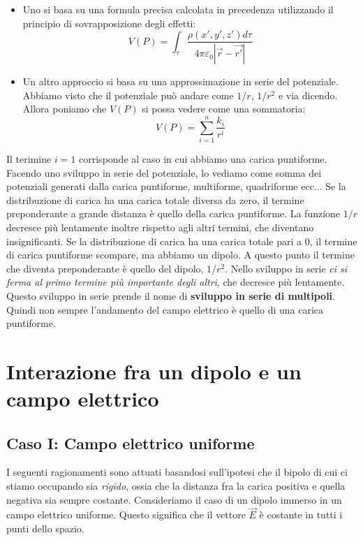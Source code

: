 \begin{itemize}
	\item Uno si basa su una formula precisa calcolata in precedenza utilizzando il principio di sovrapposizione degli effetti:
	\[
		V(P) = \int_{\tau}\frac{\rho (x',y',z') d\tau}{4\pi \varepsilon_0 |\vec{r} - \vec{r'}|}
	\]
	\item Un altro approccio si basa su una approssimazione in serie del potenziale. Abbiamo visto che il potenziale può andare come $1/r$, $1/r^2$ e via dicendo. Allora poniamo che $V(P)$ si possa vedere come una sommatoria:
	\[
		V(P) = \sum_{i=1}^n \frac{k_i}{r^i}
	\]
\end{itemize}

Il terimine $i=1$ corrisponde al caso in cui abbiamo una carica puntiforme. Facendo uno sviluppo in serie del potenziale, lo vediamo come somma dei potenziali generati dalla carica puntiforme, multiforme, quadriforme ecc... Se la distribuzione di carica ha una carica totale diversa da zero, il termine preponderante a grande distanza è quello della carica puntiforme. La funzione $1/r$ decresce più lentamente inoltre rispetto agli altri termini, che diventano insignificanti. Se la distribuzione di carica ha una carica totale pari a $0$, il termine di carica puntiforme scompare, ma abbiamo un dipolo. A questo punto il termine che diventa preponderante è quello del dipolo, $1/r^2$. Nello sviluppo in serie \emph{ci si ferma al primo termine più importante degli altri}, che decresce più lentamente. Questo sviluppo in serie prende il nome di \textbf{sviluppo in serie di multipoli}. Quindi non sempre l'andamento del campo elettrico è quello di una carica puntiforme.

\section{Interazione fra un dipolo e un campo elettrico}

\subsection{Caso I: Campo elettrico uniforme}

I seguenti ragionamenti sono attuati basandosi sull'ipotesi che il bipolo di cui ci stiamo occupando sia \emph{rigido}, ossia che la distanza fra la carica positiva e quella negativa sia sempre costante. Consideriamo il caso di un dipolo immerso in un campo elettrico uniforme. Questo significa che il vettore $\vec{E}$ è costante in tutti i punti dello spazio.

